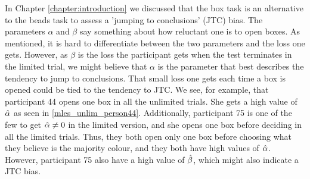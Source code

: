 In Chapter \ref{chapter:introduction} we discussed that the box task is an alternative to the beads task to assess a 'jumping to conclusions' (JTC) bias. The parameters $\alpha$ and $\beta$ say something about how reluctant one is to open boxes. As mentioned, it is hard to differentiate between the two parameters and the loss one gets. 
However, as $\beta$ is the loss the participant gets when the test terminates in the limited trial, we might believe that $\alpha$ is the parameter that best describes the tendency to jump to conclusions. That small loss one gets each time a box is opened could be tied to the tendency to JTC. We see, for example, that participant 44 opens one box in all the unlimited trials. She gets a high value of $\hat{\alpha}$ as seen in \eqref{mles_unlim_person44}.  Additionally, participant 75 is one of the few to get $\hat{\alpha} \neq 0$ in the limited version, and she opens one box before deciding in all the limited trials. 
Thus, they both open only one box before choosing what they believe is the majority colour, and they both have high values of $\hat{\alpha}$. However, participant 75 also have a high value of $\hat{\beta}$, which might also indicate a JTC bias. 



